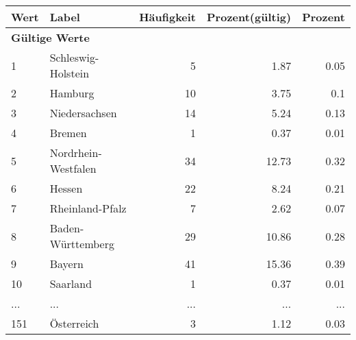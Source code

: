      \begin{longtable}{lXrrr}
     \toprule
     \textbf{Wert} & \textbf{Label} & \textbf{Häufigkeit} & \textbf{Prozent(gültig)} & \textbf{Prozent} \\
     \endhead
     \midrule
     \multicolumn{5}{l}{\textbf{Gültige Werte}}\\
        1 & \multicolumn{1}{X}{Schleswig-Holstein} & %
          \num{5} &
          \num[round-mode=places,round-precision=2]{1,87} &
          \num[round-mode=places,round-precision=2]{0,05} \\
        2 & \multicolumn{1}{X}{Hamburg} & %
          \num{10} &
          \num[round-mode=places,round-precision=2]{3,75} &
          \num[round-mode=places,round-precision=2]{0,1} \\
        3 & \multicolumn{1}{X}{Niedersachsen} & %
          \num{14} &
          \num[round-mode=places,round-precision=2]{5,24} &
          \num[round-mode=places,round-precision=2]{0,13} \\
        4 & \multicolumn{1}{X}{Bremen} & %
          \num{1} &
          \num[round-mode=places,round-precision=2]{0,37} &
          \num[round-mode=places,round-precision=2]{0,01} \\
        5 & \multicolumn{1}{X}{Nordrhein-Westfalen} & %
          \num{34} &
          \num[round-mode=places,round-precision=2]{12,73} &
          \num[round-mode=places,round-precision=2]{0,32} \\
        6 & \multicolumn{1}{X}{Hessen} & %
          \num{22} &
          \num[round-mode=places,round-precision=2]{8,24} &
          \num[round-mode=places,round-precision=2]{0,21} \\
        7 & \multicolumn{1}{X}{Rheinland-Pfalz} & %
          \num{7} &
          \num[round-mode=places,round-precision=2]{2,62} &
          \num[round-mode=places,round-precision=2]{0,07} \\
        8 & \multicolumn{1}{X}{Baden-Württemberg} & %
          \num{29} &
          \num[round-mode=places,round-precision=2]{10,86} &
          \num[round-mode=places,round-precision=2]{0,28} \\
        9 & \multicolumn{1}{X}{Bayern} & %
          \num{41} &
          \num[round-mode=places,round-precision=2]{15,36} &
          \num[round-mode=places,round-precision=2]{0,39} \\
        10 & \multicolumn{1}{X}{Saarland} & %
          \num{1} &
          \num[round-mode=places,round-precision=2]{0,37} &
          \num[round-mode=places,round-precision=2]{0,01} \\
       ... & ... & ... & ... & ... \\
        151 & \multicolumn{1}{X}{Österreich} & %
          \num{3} &
          \num[round-mode=places,round-precision=2]{1,12} &
          \num[round-mode=places,round-precision=2]{0,03} \\


\end{longtable}
